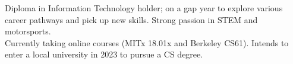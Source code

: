 

\begin{cvparagraph}

Diploma in Information Technology holder; on a gap year to explore various career pathways and pick up new skills. Strong passion in STEM and motorsports. \\Currently taking online courses (MITx 18.01x and Berkeley CS61).
Intends to enter a local university in 2023 to pursue a CS degree. 
\end{cvparagraph}
